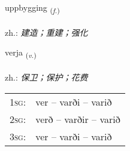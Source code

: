 \documentclass[frontgrid, backgrid]{flacards}\usepackage[]{graphicx}\usepackage[]{xcolor}
\begin{document}
{uppbygging \small{\textsubscript{(\textit{f.})}} \\[1ex] %
\textphonetic{[ʏhpɪciŋk]} \\
zh.: \emph{建造；重建；强化} \\  [2ex]
\renewcommand*{\arraystretch}{0.8}
}

\renewcommand{\flhead}{\vskip5pt \fboxsep=0pt {\small\bfseries\footnotesize Sagnorð | 动词}}
\renewcommand{\fcfoot}{\vskip5pt \fboxsep=0pt \hspace{2pt}{\small\bfseries\footnotesize 1K}}

\renewcommand{\blhead}{\vskip5pt {\small\bfseries\footnotesize Sagnorð | 动词 }}
\renewcommand{\bcfoot}{\vskip5pt \hspace{2pt}{\small\bfseries\footnotesize 1K}}


{verja \small{\textsubscript{(\textit{v.})}} \\[1ex] %
\textphonetic{[vɛrja]} \\
zh.: \emph{保卫；保护；花费} \\  [2ex]
\renewcommand*{\arraystretch}{0.8}
\begin{tabular}{p{1cm}l}
\textsc{1sg}: & ver -- varði -- varið \\ 
\textsc{2sg}: & verð -- varðir -- varið \\ 
\textsc{3sg}: & ver -- varði -- varið \\ 
\end{tabular}
}


\renewcommand{\flhead}{\vskip5pt \fboxsep=0pt {\small\bfseries\footnotesize Atviksorð | 副词}}
\renewcommand{\fcfoot}{\vskip5pt \fboxsep=0pt \hspace{2pt}{\small\bfseries\footnotesize 1K}}
\end{document}
